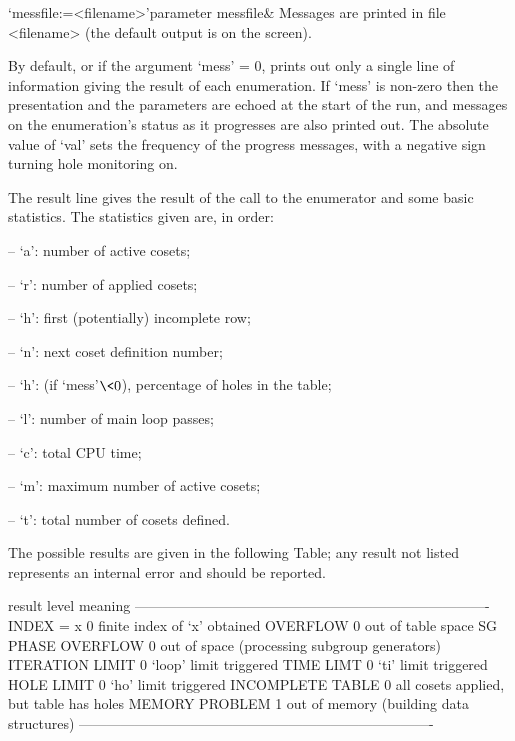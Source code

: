 \>`messfile:=<filename>'{parameter messfile}&
Messages are printed in file <filename> (the default output is on the
screen).

\enditems

By default,  or if the argument `mess'  = 0, {\ACE} prints  out only a
single line of information giving  the result of each enumeration.  If
`mess' is non-zero then the presentation and the parameters are echoed
at the start  of the run, and messages on  the enumeration's status as
it progresses are also printed  out.  The absolute value of `val' sets
the frequency of  the progress messages, with a  negative sign turning
hole monitoring on.

The result line gives the result of the call to the enumerator and some
basic statistics.  The statistics given are, in order: 
 
\beginlist
\item{--}  `a':   number of active cosets; 
\item{--}  `r':   number of applied cosets;
\item{--}  `h':   first (potentially) incomplete row;
\item{--}  `n':   next coset definition number; 
\item{--}  `h':   (if `mess'$ \< 0$), percentage of holes in the table;
\item{--}  `l':   number of main loop passes;
\item{--}  `c':   total CPU time;
\item{--}  `m':   maximum number of active cosets;
\item{--}  `t':   total number of cosets defined.
\endlist

The possible results are given in the following Table; any result not
listed represents an internal error and should be reported.

\begintt
result               level     meaning 
----------------------------------------------------------------------------
INDEX = x                0     finite index of `x' obtained
OVERFLOW                 0     out of table space
SG PHASE OVERFLOW        0     out of space (processing subgroup generators)
ITERATION LIMIT          0     `loop' limit triggered
TIME LIMT                0     `ti' limit triggered
HOLE LIMIT               0     `ho' limit triggered
INCOMPLETE TABLE         0     all cosets applied, but table has holes
MEMORY PROBLEM           1     out of memory (building data structures)
----------------------------------------------------------------------------
\endtt

